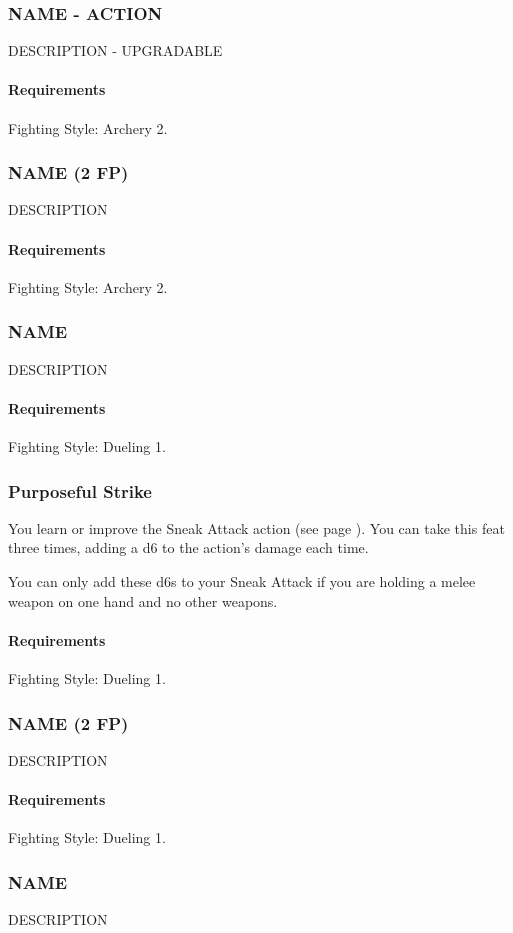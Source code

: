 \subsubsection{NAME - ACTION} \label{feat::name}
    DESCRIPTION - UPGRADABLE
    \paragraph{Requirements} Fighting Style: Archery 2.
\subsubsection{NAME (2 FP)} \label{feat::name}
    DESCRIPTION
    \paragraph{Requirements} Fighting Style: Archery 2.
\subsubsection{NAME} \label{feat::name}
    DESCRIPTION
    \paragraph{Requirements} Fighting Style: Dueling 1.
\subsubsection{Purposeful Strike} \label{feat::purposefulstrike}
    You learn or improve the Sneak Attack action (see page \pageref{act:sneakattack}).
    You can take this feat three times, adding a d6 to the action's damage each time.

    You can only add these d6s to your Sneak Attack if you are holding a melee weapon on one hand and no other weapons.
    \paragraph{Requirements} Fighting Style: Dueling 1.
\subsubsection{NAME (2 FP)} \label{feat::name}
    DESCRIPTION
    \paragraph{Requirements} Fighting Style: Dueling 1.
\subsubsection{NAME} \label{feat::name}
    DESCRIPTION
